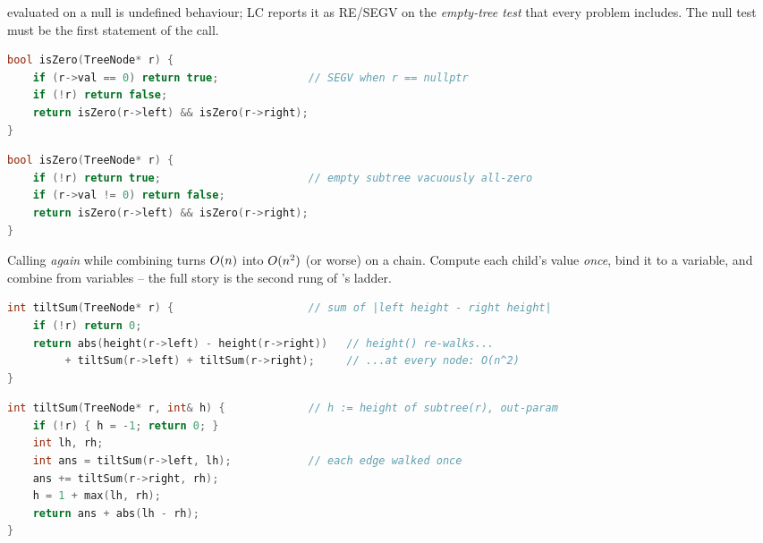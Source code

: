 \begin{warningbox}
 evaluated on a null  is undefined behaviour; LC
reports it as RE/SEGV on the \emph{empty-tree test} that every
problem includes. The null test must be the first statement of the call.
\end{warningbox}
\begin{lstlisting}[caption={\textcolor{warningred}{WRONG}: read first, check later}, language=C++, basicstyle=\ttfamily\small]
bool isZero(TreeNode* r) {
    if (r->val == 0) return true;              // SEGV when r == nullptr
    if (!r) return false;
    return isZero(r->left) && isZero(r->right);
}
\end{lstlisting}
\begin{lstlisting}[caption={\textcolor{successgreen}{RIGHT}: guard, then read}, language=C++, basicstyle=\ttfamily\small]
bool isZero(TreeNode* r) {
    if (!r) return true;                       // empty subtree vacuously all-zero
    if (r->val != 0) return false;
    return isZero(r->left) && isZero(r->right);
}
\end{lstlisting}

\begin{warningbox}
Calling  \emph{again} while combining turns $O(n)$ into
$O(n^2)$ (or worse) on a chain. Compute each child's value \emph{once}, bind
it to a variable, and combine from variables -- the full story is the second
rung of 's ladder.
\end{warningbox}
\begin{lstlisting}[caption={\textcolor{warningred}{WRONG}: recompute per use -- quadratic on chains}, language=C++, basicstyle=\ttfamily\small]
int tiltSum(TreeNode* r) {                     // sum of |left height - right height|
    if (!r) return 0;
    return abs(height(r->left) - height(r->right))   // height() re-walks...
         + tiltSum(r->left) + tiltSum(r->right);     // ...at every node: O(n^2)
}
\end{lstlisting}
\begin{lstlisting}[caption={\textcolor{successgreen}{RIGHT}: one pass, children report their own height}, language=C++, basicstyle=\ttfamily\small]
int tiltSum(TreeNode* r, int& h) {             // h := height of subtree(r), out-param
    if (!r) { h = -1; return 0; }
    int lh, rh;
    int ans = tiltSum(r->left, lh);            // each edge walked once
    ans += tiltSum(r->right, rh);
    h = 1 + max(lh, rh);
    return ans + abs(lh - rh);
}
\end{lstlisting}

